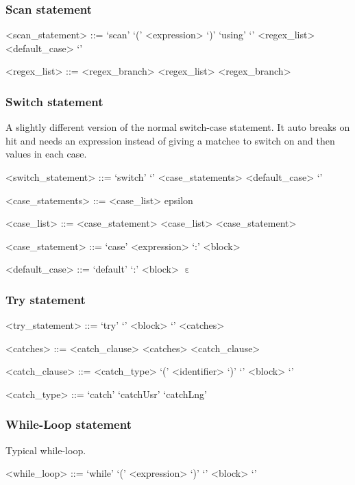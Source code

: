%
\subsubsection{Scan statement}

\begin{grammar}
<scan_statement> ::= `scan' `(' <expression> `)' `using' `{' <regex_list> <default_case> `}'

<regex_list> ::= <regex_branch>
\alt <regex_list> <regex_branch>
\end{grammar}

%
\subsubsection{Switch statement}

A slightly different version of the normal switch-case statement. It auto breaks on hit and needs an expression instead of giving a matchee to switch on and  then values in each case.

\begin{grammar}
<switch_statement> ::= `switch' `{' <case_statements> <default_case> `}'

<case_statements> ::= <case_list>
\alt epsilon

<case_list> ::= <case_statement>
\alt <case_list> <case_statement>

<case_statement> ::= `case' <expression> `:' <block>

<default_case> ::= `default' `:' <block>
\alt $\upepsilon$
\end{grammar}

%
\subsubsection{Try statement}

\begin{grammar}
<try_statement> ::= `try' `{' <block> `}' <catches>

<catches> ::= <catch_clause>
\alt <catches> <catch_clause>

<catch_clause> ::= <catch_type> `(' <identifier> `)' `{' <block> `}'

<catch_type> ::= `catch'
\alt `catchUsr'
\alt `catchLng'
\end{grammar}

%
\subsubsection{While-Loop statement}

Typical while-loop.

\begin{grammar}
<while_loop> ::= `while' `(' <expression> `)' `{' <block> `}'
\end{grammar}

\clearpage

\begin{verbatim}









 \end{verbatim}